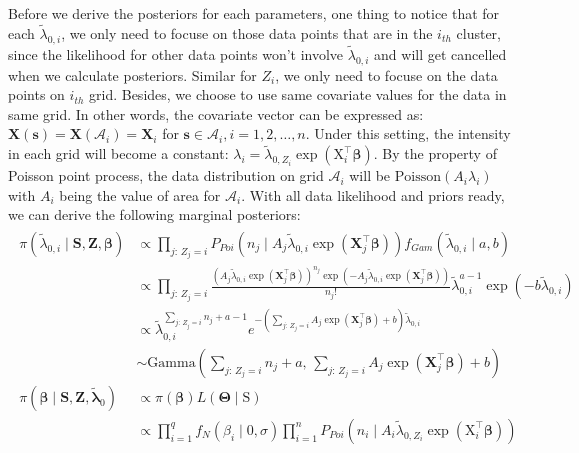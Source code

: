 \documentclass[12pt]{article}
\begin{document}
Before we derive the posteriors for each parameters, one thing to
notice that for each $\tilde{\lambda}_{0, i}$, we only need to focuse
on those data points that are in the $i_{th}$ cluster, since the
likelihood for other data points won't involve
$\tilde{\lambda}_{0, i}$ and will get cancelled when we calculate
posteriors. Similar for $Z_i$, we only need to focuse on the data
points on $i_{th}$ grid. Besides, we choose to use same covariate
values for the data in same grid. In other words, the covariate vector
can be expressed as:
$\mathbf{X}(\mathbf{s}) = \mathbf{X}(\mathcal{A}_i) = \mathbf{X}_i$ for
$\mathbf{s} \in \mathcal{A}_i, i = 1, 2, \dots, n$. Under this
setting, the intensity in each grid will become a constant:
$\lambda_i = \tilde{\lambda}_{0, Z_i}\exp(\mathrm{X}^\top_i\bm{\beta})$.
By the property of Poisson point process, the data distribution on
grid $\mathcal{A}_i$ will be $\mathrm{Poisson}(A_i\lambda_i)$ with
$A_i$ being the value of area for $\mathcal{A}_i$. With all data
likelihood and priors ready, we can derive the following marginal
posteriors:
\begin{align}\label{eq:prior_lambda_beta}
  \begin{split}
    \pi(\tilde{\lambda}_{0, i} \mid \mathbf{S}, \mathbf{Z},
    \bm{\beta}) &\propto \prod_{j:\,Z_j = i}
    P_{Poi}\left(n_j \mid A_j\tilde{\lambda}_{0,i}\exp(\mathbf{X}_j^\top\bm{\beta})\right)
    f_{Gam}(\tilde{\lambda}_{0, i} \mid a, b)\\
    &\propto \prod_{j:\,Z_j=i} \frac{\left(A_j\tilde{\lambda}_{0, i}
        \exp(\mathbf{X}_j^\top \bm{\beta})\right)^{n_j}
      \exp\left(-A_j\tilde{\lambda}_{0, i}
        \exp(\mathbf{X}_j^\top\bm{\beta})\right)}{n_j!}
    \tilde{\lambda}_{0, i}^{a-1}\exp(-b\tilde{\lambda}_{0, i})\\
    &\propto \tilde{\lambda}_{0, i}^{\sum_{j:\,Z_j = i}
      n_j+a-1}e^{-\left(\sum_{j:\,Z_j = i}
        A_j\exp(\mathbf{X}_j^\top\bm{\beta}) +
        b\right)\tilde{\lambda}_{0, i}}\\
    &\sim \mathrm{Gamma}\left(\sum_{j:\,Z_j = i} n_j+a,\,\sum_{j:\,Z_j
        = i}A_j\exp(\mathbf{X}_j^\top\bm{\beta})+b \right)\\
    \pi(\bm{\beta}\mid \mathbf{S}, \mathbf{Z},
    \tilde{\bm{\lambda}}_0) &\propto \pi(\bm{\beta})L(\bm{\Theta}\mid
    \mathrm{S})\\
    &\propto \prod_{i=1}^q f_{N}(\beta_i\mid 0, \sigma)
    \prod_{i=1}^n P_{Poi} \left(n_i \mid
      A_i\tilde{\lambda}_{0, Z_i} \exp(\mathrm{X}_i^\top\bm{\beta})\right)
  \end{split}
\end{align}
\end{document}
